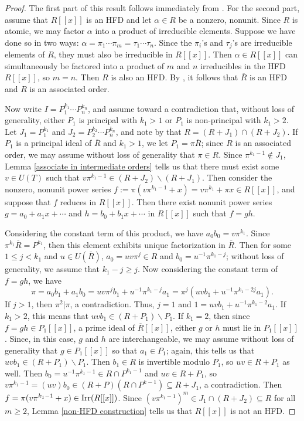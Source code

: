 \documentclass[12pt]{amsart}
\theoremstyle{definition}
\newcommand{\Rbar}{{\overline{R}}}
\newcommand{\Irr}{\textup{Irr}}
\begin{document}
\begin{proof}
    The first part of this result follows immediately from \cite[Theorems 3.8, 5.9]{radicalconductor}. For the second part, assume that $R[[x]]$ is an HFD and let $\alpha\in R$ be a nonzero, nonunit. Since $R$ is atomic, we may factor $\alpha$ into a product of irreducible elements. Suppose we have done so in two ways: $\alpha=\pi_1\cdots\pi_m=\tau_1\cdots\tau_n.$ Since the $\pi_i$'s and $\tau_j$'s are irreducible elements of $R$, they must also be irreducible in $R[[x]]$. Then $\alpha\in R[[x]]$ can simultaneously be factored into a product of $m$ and $n$ irreducibles in the HFD $R[[x]]$, so $m=n$. Then $R$ is also an HFD. By \cite[Theorem 1.1]{rago}, it follows that $\Rbar$ is an HFD and $R$ is an associated order.

    Now write $I=P_1^{k_1}\cdots P_n^{k_n}$, and assume toward a contradiction that, without loss of generality, either $P_1$ is principal with $k_1>1$ or $P_1$ is non-principal with $k_1>2$. Let $J_1=P_1^{k_1}$ and $J_2=P_2^{k_2}\cdots P_n^{k_n}$, and note by \cite[Theorem 4.6]{subringrelations} that $R=(R+J_1)\cap (R+J_2)$. If $P_1$ is a principal ideal of $\Rbar$ and $k_1>1$, we let $P_1=\pi\Rbar$; since $R$ is an associated order, we may assume without loss of generality that $\pi\in R$. Since $\pi^{k_1-1}\notin J_1$, Lemma \ref{associate in intermediate orders} tells us that there must exist some $v\in U(T)$ such that $v\pi^{k_1-1}\in (R+J_2)\backslash(R+J_1)$. Then consider the nonzero, nonunit power series $f:=\pi(v\pi^{k_1-1}+x)=v\pi^{k_1}+\pi x\in R[[x]]$, and suppose that $f$ reduces in $R[[x]]$. Then there exist nonunit power series $g=a_0+a_1x+\cdots$ and $h=b_0+b_1x+\cdots$ in $R[[x]]$ such that $f=gh$.

    Considering the constant term of this product, we have $a_0b_0=v\pi^{k_1}$. Since $\pi^{k_1}\Rbar=P^{k_1}$, then this element exhibits unique factorization in $\Rbar$. Then for some $1\leq j<k_1$ and $u\in U(\Rbar)$, $a_0=uv\pi^j\in R$ and $b_0=u^{-1}\pi^{k_1-j}$; without loss of generality, we assume that $k_1-j\geq j$. Now considering the constant term of $f=gh$, we have $$\pi=a_0b_1+a_1b_0=uv\pi^jb_1+u^{-1}\pi^{k_1-j}a_1=\pi^j(uvb_1+u^{-1}\pi^{k_1-2j}a_1).$$
    If $j>1$, then $\pi^2|\pi$, a contradiction. Thus, $j=1$ and $1=uvb_1+u^{-1}\pi^{k_1-2}a_1$. If $k_1>2$, this means that $uvb_1\in (R+P_1)\backslash P_1$. If $k_1=2$, then since $f=gh\in P_1[[x]]$, a prime ideal of $\Rbar[[x]]$, either $g$ or $h$ must lie in $P_1[[x]]$. Since, in this case, $g$ and $h$ are interchangeable, we may assume without loss of generality that $g\in P_1[[x]]$ so that $a_1\in P_1$; again, this tells us that $uvb_1\in (R+P_1)\backslash P_1$. Then $b_1\in R$ is invertible modulo $P_1$, so $uv\in R+P_1$ as well. Then $b_0=u^{-1}\pi^{k_1-1}\in R\cap P^{k_1-1}$ and $uv\in R+P_1$, so $v\pi^{k_1-1}=(uv)b_0\in (R+P)(R\cap P^{k-1})\subseteq R+J_1$, a contradiction. Then $f=\pi(v\pi^{k_1-1}+x)\in \Irr(R[[x]])$. Since $(v\pi^{k_1-1})^m\in J_1\cap (R+J_2)\subseteq R$ for all $m\geq 2$, Lemma \ref{non-HFD construction} tells us that $R[[x]]$ is not an HFD.


\end{proof}
\end{document}
